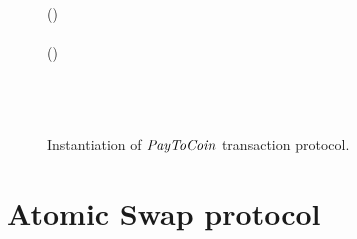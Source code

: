 \begin{figure}
\begin{center}
{\begin{varwidth}{\textwidth}
{                \< \< \varProofBob \opFunResult {} \\
                \< \< \varTx \opAssign \varTx \opConc (\varCoinOutBob \opConc \varExcessBob \opConc \varSigBob \opConc \varProofBob) \\
                \< \sendmessageleft*{\varTx} \< \\
                (\varSigBob \opSeperate \varExcessBob) \opFunResult \varTx \< \< \\
                \procVerfPtSig{\varSigBob}{\varMsg}{\varExcessAlice}{\varExcessBob}  \< \< \\
                \varSigAlice \opFunResult {} \< \< \\
                \varSigFin \opFunResult \procFinSig{\varSigAlice}{\varSigBob} \< \< \\
                \pcreturn \varTx \opAssign \varTx \opConc \varSigFin
            }
        \end{varwidth}
        }
    \end{center}
    \caption{Instantiation of $\mathit{PayToCoin}$ transaction protocol.}
    \label{fig:payToCoin}
\end{figure}

\section{Atomic Swap protocol}\label{sec:atomic-swap}